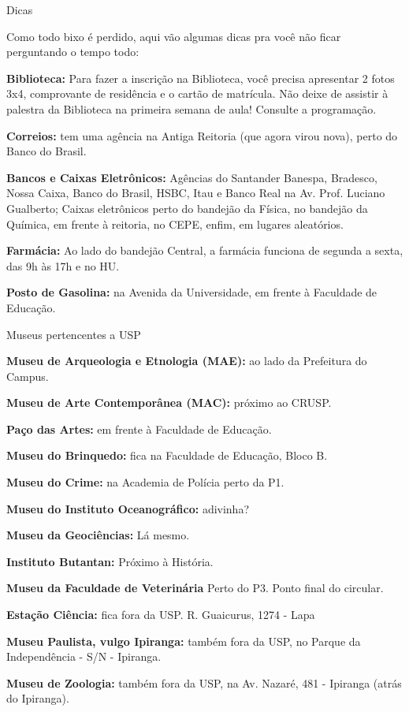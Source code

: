 \begin{secao}{Dicas}

Como todo bixo é perdido, aqui vão algumas dicas pra você não ficar perguntando
o tempo todo:

{\bf Biblioteca:} Para fazer a inscrição na Biblioteca, você precisa
apresentar 2 fotos 3x4, comprovante de residência e o cartão de matrícula. Não
deixe de assistir à palestra da Biblioteca na primeira semana de aula! Consulte
a programação.

{\bf Correios:} tem uma agência na Antiga Reitoria (que agora virou nova),
perto do Banco do Brasil.

{\bf Bancos e Caixas Eletrônicos:} Agências do Santander Banespa, Bradesco,
Nossa Caixa, Banco do Brasil, HSBC, Itau e Banco Real na Av. Prof. Luciano
Gualberto; Caixas eletrônicos perto do bandejão da Física, no bandejão da
Química, em frente à reitoria, no CEPE, enfim, em lugares aleatórios.

{\bf Farmácia:} Ao lado do bandejão Central, a farmácia funciona de segunda a
sexta, das 9h às 17h e no HU.

{\bf Posto de Gasolina:} na Avenida da Universidade, em frente à Faculdade de
Educação.

\begin{subsecao}{Museus pertencentes a USP}

{\bf Museu de Arqueologia e Etnologia (MAE):} ao lado da Prefeitura do Campus.

{\bf Museu de Arte Contemporânea (MAC):} próximo ao CRUSP.

{\bf Paço das Artes:} em frente à Faculdade de Educação.

{\bf Museu do Brinquedo:} fica na Faculdade de Educação, Bloco B.

{\bf Museu do Crime:} na Academia de Polícia perto da P1.

{\bf Museu do Instituto Oceanográfico:} adivinha?

{\bf Museu da Geociências:} Lá mesmo.

{\bf Instituto Butantan:} Próximo à História.

{\bf Museu da Faculdade de Veterinária} Perto do P3. Ponto final do circular.

{\bf Estação Ciência:} fica fora da USP. R. Guaicurus, 1274 - Lapa

{\bf Museu Paulista, vulgo Ipiranga: }também fora da USP, no Parque da
Independência - S/N  - Ipiranga.

{\bf Museu de Zoologia: }também fora da USP, na Av. Nazaré, 481  -
Ipiranga (atrás do Ipiranga).


\end{subsecao}
\end{secao}
